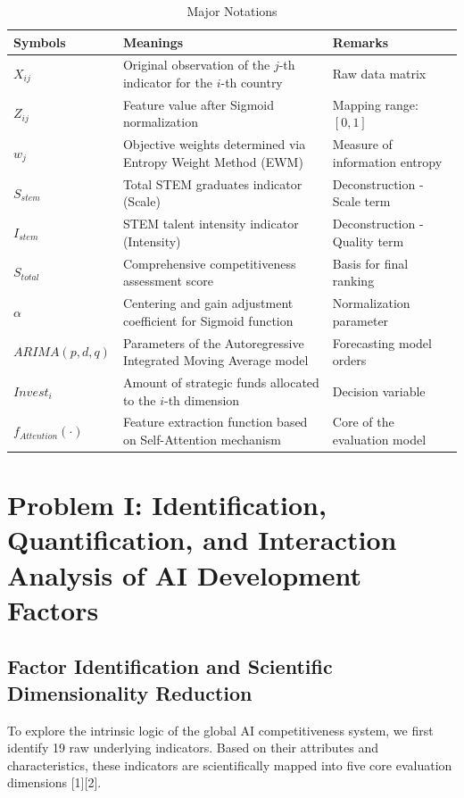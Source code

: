 \documentclass[12pt]{article}
\begin{document}
	\begin{table}[H]
		\centering
		\caption{Major Notations}
		\begin{tabular}{lll}
			\toprule
			\textbf{Symbols} & \textbf{Meanings} & \textbf{Remarks} \\ \midrule
			$X_{ij}$ & Original observation of the $j$-th indicator for the $i$-th country & Raw data matrix \\
			$Z_{ij}$ & Feature value after Sigmoid normalization & Mapping range: $[0, 1]$ \\
			$w_j$ & Objective weights determined via Entropy Weight Method (EWM) & Measure of information entropy \\
			$S_{stem}$ & Total STEM graduates indicator (Scale) & Deconstruction - Scale term \\
			$I_{stem}$ & STEM talent intensity indicator (Intensity) & Deconstruction - Quality term \\
			$S_{total}$ & Comprehensive competitiveness assessment score & Basis for final ranking \\
			$\alpha$ & Centering and gain adjustment coefficient for Sigmoid function & Normalization parameter \\
			$ARIMA(p, d, q)$ & Parameters of the Autoregressive Integrated Moving Average model & Forecasting model orders \\
			$Invest_i$ & Amount of strategic funds allocated to the $i$-th dimension & Decision variable \\
			$f_{Attention}(\cdot)$ & Feature extraction function based on Self-Attention mechanism & Core of the evaluation model \\ \bottomrule
		\end{tabular}
	\end{table}
	
	\section{Problem I: Identification, Quantification, and Interaction Analysis of AI Development Factors}
	\subsection{Factor Identification and Scientific Dimensionality Reduction}
	To explore the intrinsic logic of the global AI competitiveness system, we first identify 19 raw underlying indicators. Based on their attributes and characteristics, these indicators are scientifically mapped into five core evaluation dimensions [1][2].
	
\end{document}
